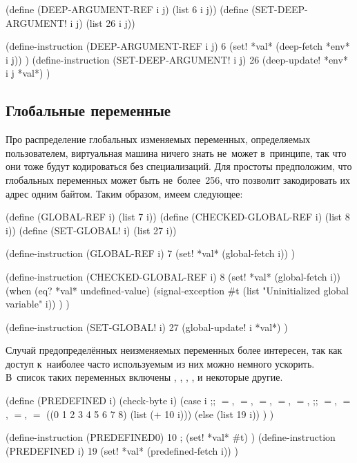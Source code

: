 \begin{code:lisp}
(define (DEEP-ARGUMENT-REF i j) (list 6 i j))
(define (SET-DEEP-ARGUMENT! i j) (list 26 i j))

(define-instruction (DEEP-ARGUMENT-REF i j) 6
  (set! *val* (deep-fetch *env* i j)) )
(define-instruction (SET-DEEP-ARGUMENT! i j) 26
  (deep-update! *env* i j *val*) )
\end{code:lisp}


\subsection{Глобальные переменные}\label{compilation/instructions/ssect:globals}

Про распределение глобальных изменяемых переменных, определяемых пользователем,
виртуальная машина ничего знать не~может в~принципе, так что они тоже будут
кодироваться без специализаций. Для простоты предположим, что глобальных
переменных может быть не~более~256, что позволит закодировать их адрес одним
байтом. Таким образом, имеем следующее:

\begin{code:lisp}
(define (GLOBAL-REF i) (list 7 i))
(define (CHECKED-GLOBAL-REF i) (list 8 i))
(define (SET-GLOBAL! i) (list 27 i))

(define-instruction (GLOBAL-REF i) 7
  (set! *val* (global-fetch i)) )

(define-instruction (CHECKED-GLOBAL-REF i) 8
  (set! *val* (global-fetch i))
  (when (eq? *val* undefined-value)
    (signal-exception #t (list "Uninitialized global variable" i)) ) )

(define-instruction (SET-GLOBAL! i) 27
  (global-update! i *val*) )
\end{code:lisp}

Случай предопределённых неизменяемых переменных более интересен, так как доступ
к~наиболее часто используемым из них можно немного ускорить. В~список таких
переменных включены , , , ,  и некоторые
другие.


\begin{code:lisp}
(define (PREDEFINED i)
  (check-byte i)
  (case i
    ;; ${}={}$, ${}={}$, ${}={}$\ic{()},%
    {} ${}={}$, ${}={}$,
    ;; ${}={}$, ${}={}$,%
    {} ${}={}$, ${}={}$
    ((0 1 2 3 4 5 6 7 8) (list (+ 10 i)))
    (else                (list 19 i)) ) )

(define-instruction (PREDEFINED0) 10    ; 
  (set! *val* #t) )
(define-instruction (PREDEFINED i) 19
  (set! *val* (predefined-fetch i)) )
\end{code:lisp}

